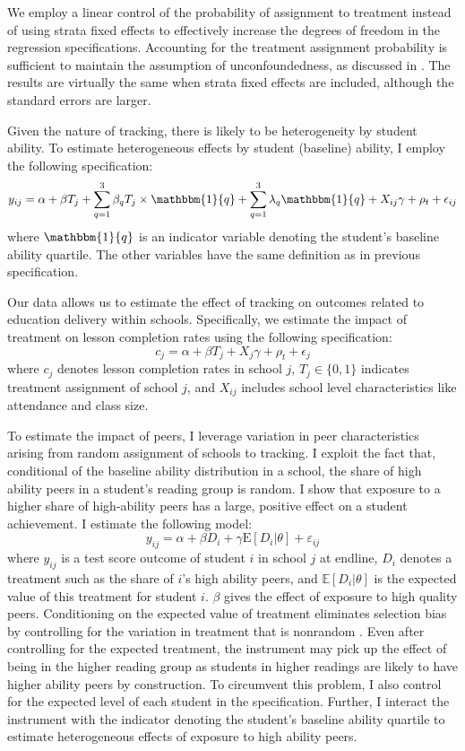 \documentclass[12pt]{article}
\begin{document}
We employ a linear control of the probability of assignment to treatment instead of using strata fixed effects to effectively increase the degrees of freedom in the regression specifications. Accounting for the treatment assignment probability is sufficient to maintain the assumption of unconfoundedness, as discussed in \cite{abdulkadirouglu2017research}. The results are virtually the same when strata fixed effects are included, although the standard errors are larger.



Given the nature of tracking, there is likely to be heterogeneity by student ability. To estimate heterogeneous effects by student (baseline) ability, I employ the following specification:
    \[ y_{ij} = \alpha + \beta T_{j} + \sum_{q=1}^3 \beta_q T_{j}\times \mathbbm{1}{q} + \sum_{q=1}^3 \lambda_q \mathbbm{1}{q}   + X_{ij} \gamma + \rho_t +\epsilon_{ij} \]
where $\mathbbm{1}{q}$ is an indicator variable denoting the student's baseline ability quartile. The other variables have the same definition as in previous specification.

Our data allows us to estimate the effect of tracking on outcomes related to education delivery within schools. Specifically, we estimate the impact of treatment on lesson completion rates using the following specification:
\[ c_{j} = \alpha + \beta T_j + X_{j} \gamma + \rho_t +\epsilon_{j}  \]
where $c_j$ denotes lesson completion rates in school $j$, $T_j \in \{0,1\}$ indicates  treatment assignment of school $j$, and $X_{ij}$ includes school level characteristics like attendance and class size.

To estimate the impact of peers, I leverage variation in peer characteristics arising from random assignment of schools to tracking. I exploit the fact that, conditional of the baseline ability distribution in a school, the share of high ability peers in a student's reading group is random. I show that exposure to a higher share of high-ability peers has a large, positive effect on a student achievement. I estimate the following model:
 \[ y_{ij} = \alpha + \beta D_i + \gamma\text{E}[D_i|\theta] + \varepsilon_{ij}  \]
where $y_{ij}$ is a test score outcome of student $i$ in school $j$ at endline, $D_i$ denotes a treatment such as the share of $i$’s high ability peers, and $\mathbb{E}[D_i | \theta]$ is the expected value of this treatment for student $i$. $\beta$ gives the effect of exposure to high quality peers. Conditioning on the expected value of treatment eliminates selection bias by controlling for the variation in treatment that is nonrandom \citep{borusyak2020non, hirano2004propensity, rosenbaum1983central}. Even after controlling for the expected treatment, the instrument may pick up the effect of being in the higher reading group as students in higher readings are likely to have higher ability peers by construction. To circumvent this problem, I also control for the expected level of each student in the specification. Further, I interact the instrument with the indicator denoting the student's baseline ability quartile to estimate heterogeneous effects of exposure to high ability peers. 
\end{document}

